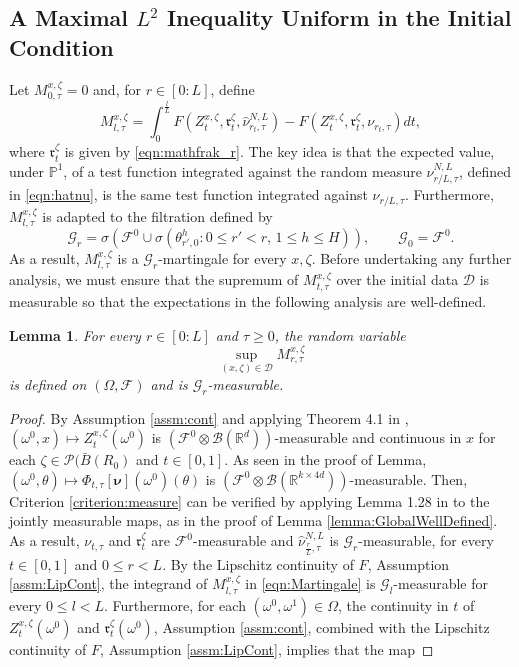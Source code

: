 \documentclass{article}
\newtheorem{lemma}[theorem]{Lemma}
\newcommand{\R}{\mathbb{R}}
\begin{document}
\begin{appendices}
\section{A Maximal $L^2$ Inequality Uniform in the Initial Condition}\label{App:H}
Let $M^{x,\zeta}_{0,\tau}=0$ and, for $r\in[0:L]$, define
\begin{equation}\label{eqn:Martingale}
M^{x,\zeta}_{l,\tau}=\int_0^{\frac{l}{L}} F\left(Z^{x,\zeta}_t,\mathfrak{r}_t^\zeta,\hat \nu^{N,L}_{r_t,\tau}\right)-F\left(Z^{x,\zeta}_t,\mathfrak{r}^\zeta_t,\nu_{r_t,\tau}\right)dt,
\end{equation}
 where $\mathfrak{r}^\zeta_t$ is given by \eqref{eqn:mathfrak_r}. The key idea is that the expected value, under $\mathbb P^1$, of a test function integrated against the random measure $\hat \nu^{N,L}_{r/L,\tau}$, defined in \eqref{eqn:hatnu}, is the same test function integrated against $\nu_{r/L,\tau}$. Furthermore, $M_{l,\tau}^{x,\zeta}$ is adapted to the filtration defined by
\begin{equation}\label{eqn:FiltrationG}
        \mathcal G_{r}=\sigma\left(\mathcal F^0 \cup \sigma\left(\mathcal \theta^h_{r',0}:0\le r'<r,\, 1\le h\le H\right)\right), \qquad \mathcal G_{0}=\mathcal F^0.
\end{equation}
 As a result, $M^{x,\zeta}_{l,\tau}$ is a $\mathcal G_{r}$-martingale for every $x,\zeta$. Before undertaking any further analysis, we must ensure that the supremum of $M^{x,\zeta}_{t,\tau}$ over the initial data $\mathscr{D}$ is measurable so that the expectations in the following analysis  are well-defined.
\begin{lemma}\label{lemma:MeasurableSupremum}
For every $r\in[0:L]$ and $\tau \ge 0$, the random variable
    $$
    \sup_{(x,\zeta)\in\mathscr{D}} M^{x,\zeta}_{r,\tau}
    $$ is defined on $(\Omega,\mathcal F)$ and is $\mathcal G_{r}$-measurable.
\end{lemma}
\begin{proof}
By Assumption \ref{assm:cont} and applying Theorem 4.1 in \cite{AZHMYAKOV201987}, $(\omega^0,x)\mapsto Z^{x,\zeta}_t(\omega^0)$ is $(\mathcal F^0\otimes \mathcal B(\R^d))$-measurable and continuous in $x$ for each $\zeta\in \mathcal P(\bar B(R_0)$ and $t\in[0,1]$. As seen in the proof of Lemma, $(\omega^0,\theta) \mapsto \Phi_{t,\tau}[\bm\nu](\omega^0)(\theta)$ is $(\mathcal F^0\otimes \mathcal B(\R^{k\times 4d}))$-measurable. Then, Criterion \ref{criterion:measure} can be verified by applying Lemma 1.28 in \cite{Kallenberg2021} to the jointly measurable maps, as in the proof of Lemma \ref{lemma:GlobalWellDefined}. As a result, $\nu_{t,\tau}$ and $\mathfrak{r}^\zeta_t$ are $\mathcal F^0$-measurable and $\hat \nu^{N,L}_{\frac{r}{L},\tau}$ is $\mathcal G_{r}$-measurable, for every $t\in[0,1]$ and $0\le r <L$. By the Lipschitz continuity of $F$, Assumption \ref{assm:LipCont}, the integrand of $M^{x,\zeta}_{l,\tau}$ in \eqref{eqn:Martingale} is $\mathcal G_l$-measurable for every $0\le l<L$. Furthermore, for each $(\omega^0,\omega^1)\in \Omega$, the continuity in $t$ of $Z^{x,\zeta}_{t}(\omega^0)$ and $\mathfrak{r}^\zeta_t(\omega^0)$, Assumption \ref{assm:cont}, combined with the Lipschitz continuity of $F$, Assumption \ref{assm:LipCont}, implies that the map

\end{proof}
\end{appendices}
\end{document}
